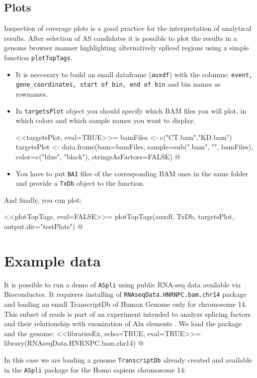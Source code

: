 \documentclass{article}
\begin{document}
\subsection{Plots}
Inspection of coverage plots is a good practice for the interpretation of analytical results. After selection of AS candidates it is possible to plot the results in a genome browser manner highlighting  alternatively spliced regions using a simple function \texttt{plotTopTags}.
\begin{itemize}
\item It is neccesary to build an small dataframe (\texttt{auxdf}) with the columns:
\texttt{event, gene\_coordinates, start of bin, end of bin} and bin names as rownames.
\item In \texttt{targetsPlot} object you should specify which BAM files you will plot, in which colors and which sample names you want to display. 

<<targetsPlot, eval=TRUE>>=
bamFiles <- c("CT.bam","KD.bam")
targetsPlot <- data.frame(bam=bamFiles, 
                        sample=sub(".bam", "", bamFiles), 
                        color=c("blue", "black"), 
                        stringsAsFactors=FALSE)
@
\item You have to put \texttt{BAI} files of the corresponding BAM ones in the same folder and provide a \texttt{TxDb} object to the function. 
\end{itemize}

And finally, you can plot:

<<plotTopTags, eval=FALSE>>=
plotTopTags(auxdf, 
            TxDb, 
            targetsPlot, 
            output.dir="testPlots")
@

\section{Example data}
It is possible to run a demo of \texttt{ASpli} using public RNA-seq data available via Bioconductor. It requieres installing of \texttt{RNAseqData.HNRNPC.bam.chr14} package and loading  an small TranscriptDb of Human Genome only for chromosome 14. This subset of reads is part of an experiment intended to analyze splicing factors and their relationship with exonization of Alu elements \cite{Zarnack2013453}. We load the package and the genome:
<<librariesEx, echo=TRUE, eval=TRUE>>=
library(RNAseqData.HNRNPC.bam.chr14)
@

In this case we are loading a genome \texttt{TranscriptDb} already created and available in the  \texttt{ASpli} package for the Homo sapiens chromosome 14:
\end{document}
